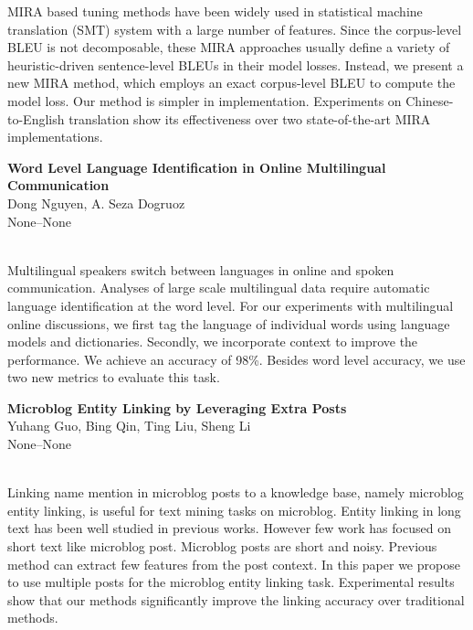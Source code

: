 \documentclass[twoside,makeidx]{book}
\begin{document}
\nopagebreak%
\noindent%
{\small MIRA based tuning methods have been widely used in statistical machine translation (SMT) system with a large number of features. Since the corpus-level BLEU is not decomposable, these MIRA approaches usually define a variety of heuristic-driven sentence-level BLEUs in their model losses. Instead, we present a new MIRA method, which employs an exact corpus-level BLEU to compute the model loss. Our method is simpler in implementation. Experiments on Chinese-to-English translation show its effectiveness over two state-of-the-art MIRA implementations.}
\par\vspace{2em}\noindent%
\begin{minipage}{\linewidth}%
\begin{center}
\textbf{\normalsize Word Level Language Identification in Online Multilingual Communication}\\
\normalsize  Dong Nguyen,  A. Seza Dogruoz\\
{\small None--None}\\
\end{center}
\end{minipage}\\[0.5em]
\nopagebreak%
\noindent%
{\small Multilingual speakers switch between languages in online and spoken communication. Analyses of large scale multilingual data require automatic language identification at the word level. For our experiments with multilingual online discussions, we first tag the language of individual words using language models and dictionaries. Secondly, we incorporate context to improve the performance. We achieve an accuracy of 98\%.  Besides word level accuracy, we use two new metrics to evaluate this task.}
\par\vspace{2em}\noindent%
\begin{minipage}{\linewidth}%
\begin{center}
\textbf{\normalsize Microblog Entity Linking by Leveraging Extra Posts}\\
\normalsize  Yuhang Guo,  Bing Qin,  Ting Liu,  Sheng Li\\
{\small None--None}\\
\end{center}
\end{minipage}\\[0.5em]
\nopagebreak%
\noindent%
{\small Linking name mention in microblog posts to a knowledge base, namely microblog entity linking, is useful for text mining tasks on microblog.  Entity linking in long text has been well studied in previous works. However few work has focused on short text like microblog post.  Microblog posts are short and noisy. Previous method can extract few features from the post context.                       In this paper we propose to use multiple posts for the microblog entity linking task.  Experimental results show that our methods significantly improve the linking accuracy over traditional methods.}
\end{document}
